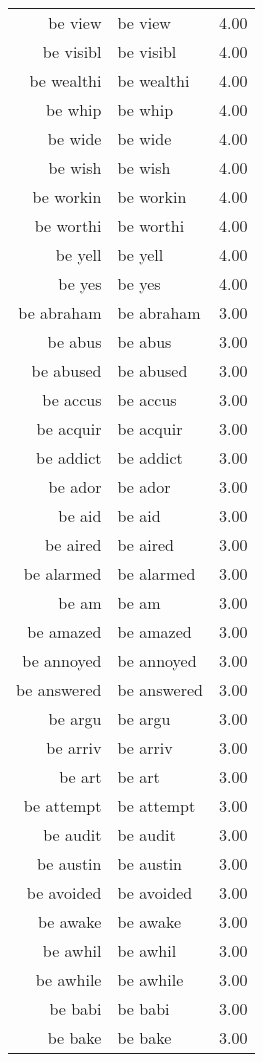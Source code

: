 \begin{table}[ht]
\begin{tabular}{rlr}
  be view & be view & 4.00 \\ 
  be visibl & be visibl & 4.00 \\ 
  be wealthi & be wealthi & 4.00 \\ 
  be whip & be whip & 4.00 \\ 
  be wide & be wide & 4.00 \\ 
  be wish & be wish & 4.00 \\ 
  be workin & be workin & 4.00 \\ 
  be worthi & be worthi & 4.00 \\ 
  be yell & be yell & 4.00 \\ 
  be yes & be yes & 4.00 \\ 
  be abraham & be abraham & 3.00 \\ 
  be abus & be abus & 3.00 \\ 
  be abused & be abused & 3.00 \\ 
  be accus & be accus & 3.00 \\ 
  be acquir & be acquir & 3.00 \\ 
  be addict & be addict & 3.00 \\ 
  be ador & be ador & 3.00 \\ 
  be aid & be aid & 3.00 \\ 
  be aired & be aired & 3.00 \\ 
  be alarmed & be alarmed & 3.00 \\ 
  be am & be am & 3.00 \\ 
  be amazed & be amazed & 3.00 \\ 
  be annoyed & be annoyed & 3.00 \\ 
  be answered & be answered & 3.00 \\ 
  be argu & be argu & 3.00 \\ 
  be arriv & be arriv & 3.00 \\ 
  be art & be art & 3.00 \\ 
  be attempt & be attempt & 3.00 \\ 
  be audit & be audit & 3.00 \\ 
  be austin & be austin & 3.00 \\ 
  be avoided & be avoided & 3.00 \\ 
  be awake & be awake & 3.00 \\ 
  be awhil & be awhil & 3.00 \\ 
  be awhile & be awhile & 3.00 \\ 
  be babi & be babi & 3.00 \\ 
  be bake & be bake & 3.00 \\ 

\end{tabular}
\end{table}
